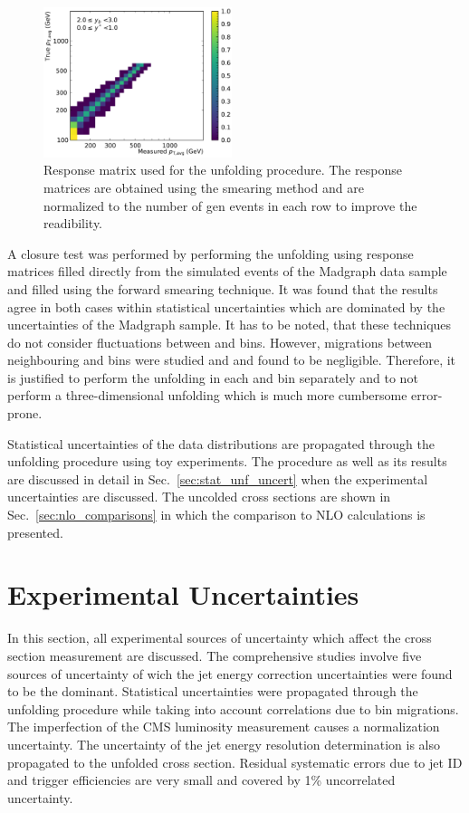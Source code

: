 \begin{figure}[htp]
    \includegraphics[width=0.49\textwidth]{figures/measurement/res_matrix_ptavg_normalized_yb2ys0.pdf}
    \caption[Response matrix used for the unfolding procedure]{Response matrix
        used for the unfolding procedure. The response matrices are obtained
        using the smearing method and are normalized to the number of gen events
        in each row to improve the readibility.}
    \label{fig:res_matrix}
\end{figure}

A closure test was performed by performing the unfolding using response matrices
filled directly from the simulated events of the Madgraph data sample and
filled using the forward smearing technique. It was found that the results agree
in both cases within statistical uncertainties which are dominated by the
uncertainties of the Madgraph sample. It has to be noted, that these
techniques do not consider fluctuations between \ystar and \yboost bins.
However, migrations between neighbouring \ystar and \yboost bins were studied
and and found to be negligible. Therefore, it is justified to perform the
unfolding in each \ystar and \yboost bin separately and to not perform a
three-dimensional unfolding which is much more cumbersome error-prone.

Statistical uncertainties of the data distributions are propagated through
the unfolding procedure using toy experiments. The procedure as well as its
results are discussed in detail in Sec.~\ref{sec:stat_unf_uncert} when the
experimental uncertainties are discussed. The uncolded cross sections are shown
in Sec.~\ref{sec:nlo_comparisons} in which the comparison to NLO calculations is presented.

\section{Experimental Uncertainties}
\label{sec:experimental_uncertainties}

In this section, all experimental sources of uncertainty which affect the cross
section measurement are discussed. The comprehensive studies involve five
sources of uncertainty of wich the jet energy correction uncertainties were
found to be the dominant. Statistical uncertainties were propagated through the
unfolding procedure while taking into account correlations due to bin
migrations. The imperfection of the CMS luminosity measurement causes a
normalization uncertainty. The uncertainty of the jet energy resolution
determination is also propagated to the unfolded cross section. Residual
systematic errors due to jet ID and trigger efficiencies are very small and
covered by 1\% uncorrelated uncertainty.

